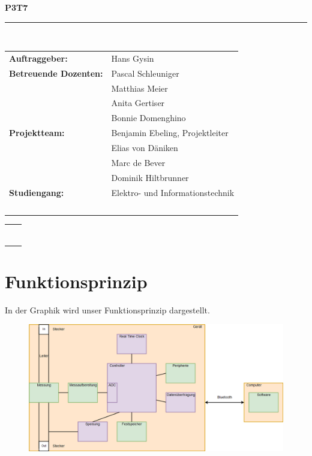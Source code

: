 \documentclass[12pt,a4paper]{article}
\begin{document}
\begin{center}


\newcommand{\HRule}{\rule{\linewidth}{0.5mm}}

{\begin{Huge}\textbf{P3T7}\end{Huge}}
\HRule \\[0.5cm]

\begin{tabular}{l l}
\textbf{Auftraggeber:} & Hans Gysin \\[0.2cm]
\textbf{Betreuende Dozenten:} & Pascal Schleuniger  \\ & Matthias Meier \\  & Anita Gertiser \\& Bonnie Domenghino \\[0.2cm]
\textbf{Projektteam:} & Benjamin Ebeling, Projektleiter \\ & Elias von Däniken \\ & Marc de Bever \\ & Dominik Hiltbrunner   \\[0.2cm]
\textbf{Studiengang:} & Elektro- und Informationstechnik\\\

\end{tabular}
\begin{tabular}{l l}
\HRule \\[0.5cm]
\end{tabular}
\end{center}



\section{Funktionsprinzip}
In der Graphik wird unser Funktionsprinzip dargestellt.
\\

\begin{figure}[htbp] 
  \centering
\includegraphics[scale=0.45]{P3T7-Blockdiagramm.png}
  \caption{}
  \label{fig:Bild1}
\end{figure}
\end{document}
